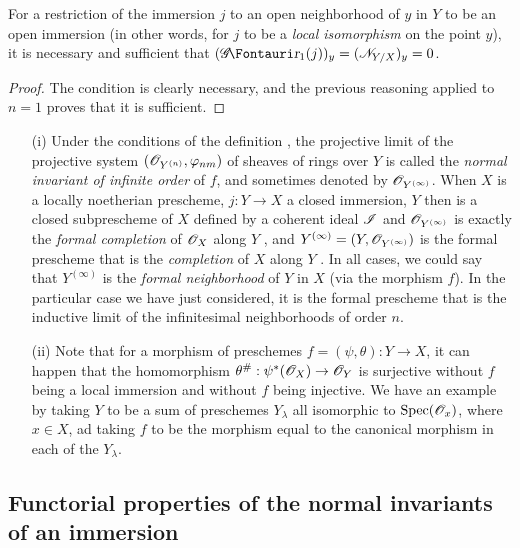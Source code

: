 \begin{corollary}[16.1.10]
\label{IV.16.1.10}
For a restriction of the immersion $j$ to an open neighborhood of $y$ in $Y$ to be an open immersion (in other words, for $j$ to be a \emph{local isomorphism} on the point $y$), it is necessary and sufficient that $(\shGr_1(j))_y = (\sh{N}_{Y/X})_y = 0$.
\end{corollary}

\begin{proof}
The condition is clearly necessary, and the previous reasoning applied to $n=1$ proves that it is sufficient.
\end{proof}

\begin{remark}[16.1.11]
\label{IV.16.1.11}
\medskip\noindent
\begin{enumerate}
  \item[(i)] Under the conditions of the definition , the projective limit of the projective system $(\mathscr{O}_{Y^{(n)}}, \varphi_{nm})$ of sheaves of rings over $Y$ is called the \emph{normal invariant of infinite order} of $f$, and sometimes denoted by $\mathscr{O}_{Y^{(\infty)}}$.
  When $X$ is a locally noetherian prescheme, $j:Y \to X$ a closed immersion, $Y$ then is a closed subprescheme of $X$ defined by a coherent ideal $\mathscr{I}$ and $\mathscr{O}_{Y^{(\infty)}}$ is exactly the \emph{formal completion} of $\mathscr{O}_X$ along $Y$ , and $Y^{(\infty)} = (Y, \mathscr{O}_{Y^{(\infty)}})$ is the formal prescheme that is the \emph{completion} of $X$ along $Y$ .
  In all cases, we could say that $Y^{(\infty)}$ is the \emph{formal neighborhood} of $Y$ in $X$ (via the morphism $f$).
  In the particular case we have just considered, it is the formal prescheme that is the inductive limit of the infinitesimal neighborhoods of order $n$.
  \item[(ii)] Note that for a morphism of preschemes $f=(\psi, \theta): Y \to X$, it can happen that the homomorphism $\theta^\#:\psi^*(\sh{O}_X) \to \sh{O}_Y$ is surjective without $f$ being a local 
  immersion and without $f$ being injective.
  We have an example by taking $Y$ to be a sum of preschemes $Y_\lambda$ all isomorphic to $\operatorname{Spec}(\mathscr{O}_x)$, where $x \in X$, ad taking $f$ to be the morphism equal to the canonical morphism in each of the $Y_\lambda$.
\end{enumerate}
\end{remark}

\subsection{Functorial properties of the normal invariants of an immersion}
\label{IV.16.2}

